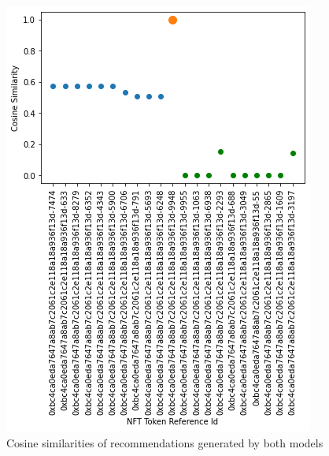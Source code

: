 \documentclass[conference]{IEEEtran}
\begin{document}
\begin{figure}[htbp]
\centerline{\includegraphics[width=\linewidth]{images/Cosine_Similarities_of_Recommended_NFTs_Trait_Content_Based+Total_Rarity_Recomendations_Models.png}}
\caption{Cosine similarities of recommendations generated by both models}
\label{fig:combined-cosine}
\end{figure}
\end{document}
